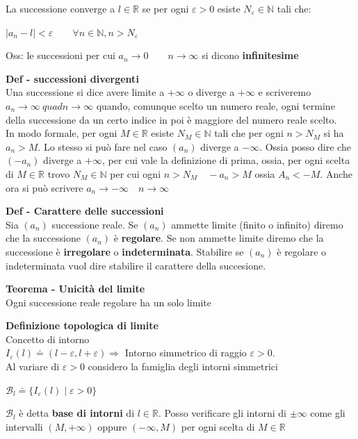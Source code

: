 \documentclass[12pt, a4paper]{article}
\begin{document}
La successione converge a $l\in\mathbb{R}$ se per ogni $\varepsilon>0$ esiste $N_{\varepsilon}\in\mathbb{N}$ tali
che:
\begin{center}
    $|a_{n}-l|<\varepsilon\qquad\forall n\in\mathbb{N}, n>N_{\varepsilon}$
\end{center}

Oss: le successioni per cui $a_{n}\to 0\qquad n\to\infty$ si dicono \textbf{infinitesime}

\textbf{Def - successioni divergenti}\\Una successione si dice avere limite a $+\infty$ o diverge a $+\infty$ e
scriveremo $a_{n}\to\infty\ quad n\to\infty$ quando, comunque scelto un numero reale, ogni termine della successione
da un certo indice in poi è maggiore del numero reale scelto.\\In modo formale, per ogni $M\in\mathbb{R}$ esiste
$N_{M}\in\mathbb{N}$ tali che per ogni $n>N_{M}$ si ha $a_{n}>M$. Lo stesso si può fare nel caso $(a_{n})$ diverge
a $-\infty$. Ossia posso dire che $(-a_{n})$ diverge a $+\infty$, per cui vale la definizione di prima, ossia,
per ogni scelta di $M\in\mathbb{R}$ trovo $N_{M}\in\mathbb{N}$ per cui ogni $n>N_{M}\quad -a_{n}>M$ ossia
$A_{n}<-M$. Anche ora si può scrivere $a_{n}\to-\infty\quad n\to\infty$

\textbf{Def - Carattere delle successioni}\\Sia $(a_{n})$ successione reale. Se $(a_{n})$ ammette limite (finito
o infinito) diremo che la successione $(a_{n})$ è \textbf{regolare}. Se non ammette limite diremo che la
successione è \textbf{irregolare} o \textbf{indeterminata}. Stabilire se $(a_{n})$ è regolare o indeterminata vuol
dire stabilire il carattere della succesione.

\textbf{Teorema - Unicità del limite}\\Ogni successione reale regolare ha un solo limite

\textbf{Definizione topologica di limite}\\Concetto di intorno\\$I_{\varepsilon}(l)\doteq(l-\varepsilon,
l+\varepsilon)\Rightarrow$ Intorno simmetrico di raggio $\varepsilon>0$.\\Al variare di $\varepsilon>0$ considero la
    famiglia degli intorni simmetrici
    \begin{center}
        $\mathcal{B}_{l}\doteq\{I_{\varepsilon}(l)\mid\varepsilon>0\}$
    \end{center}
$\mathcal{B}_{l}$ è detta \textbf{base di intorni} di $l\in\mathbb{R}$. Posso verificare gli intorni di $\pm\infty$
    come gli intervalli $(M,+\infty)$ oppure $(-\infty,M)$ per ogni scelta di $M\in\mathbb{R}$
\end{document}
